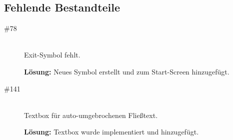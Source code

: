 %



\clearpage



\subsection*{Fehlende Bestandteile}
\begin{description}

\item[\#78] \hfill \\
\glqq Exit\grqq-Symbol fehlt.
 
{\bfseries Lösung:} Neues Symbol erstellt und zum Start-Screen hinzugefügt.
 
 
\item[\#141] \hfill \\
Textbox für auto-umgebrochenen Fließtext.
 
{\bfseries Lösung:} Textbox wurde implementiert und hinzugefügt.

\end{description}
~\\